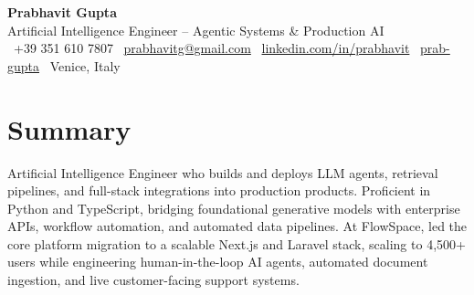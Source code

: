 \documentclass[a4paper,10pt]{article}
\begin{document}
\begin{center}
 {\Huge\bfseries Prabhavit Gupta}\\[3pt]
 {\color{accent}\large Artificial Intelligence Engineer -- Agentic Systems \& Production AI}\\[5pt]
 \faPhone\ +39 351 610 7807 \quad
 \faEnvelope\ \href{mailto:prabhavitg@gmail.com}{prabhavitg@gmail.com} \quad
 \faLinkedin\ \href{https://www.linkedin.com/in/prabhavit/}{linkedin.com/in/prabhavit} \quad
 \faGithub\ \href{https://github.com/prab-gupta}{prab-gupta} \quad
 \faMapMarker*\ Venice, Italy
\end{center}

\section{Summary}
Artificial Intelligence Engineer who builds and deploys LLM agents, retrieval pipelines, and full-stack integrations into production products. Proficient in Python and TypeScript, bridging foundational generative models with enterprise APIs, workflow automation, and automated data pipelines. At FlowSpace, led the core platform migration to a scalable Next.js and Laravel stack, scaling to 4,500+ users while engineering human-in-the-loop AI agents, automated document ingestion, and live customer-facing support systems.

\end{document}
